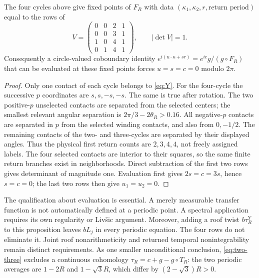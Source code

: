 \begin{proposition}\label{prop:lattice}
The four cycles above give fixed points of $F_R$ with data $(\kappa_1,\kappa_2,r,\text{return period})$ equal to the rows of
\begin{equation}\label{eq:matrix}
 V=\begin{pmatrix}0&0&2&1\\0&0&3&1\\1&0&4&1\\0&1&4&1\end{pmatrix},
                  \qquad |\det V|=1.
\end{equation}
Consequently a circle-valued coboundary identity
$e^{i(u\cdot\kappa+s r)}=e^{ic}g/(g\circ F_R)$ that can be evaluated at these fixed points forces $u=s=c=0$ modulo $2\pi$.
\end{proposition}
\begin{proof}
Only one contact of each cycle belongs to \eqref{eq:Y}. For the four-cycle the successive $p$ coordinates are $s,s,-s,-s$. The same is true after rotation. The two positive-$p$ unselected contacts are separated from the selected centers; the smallest relevant angular separation is $2\pi/3-2\theta_R>0.16$. All negative-$p$ contacts are separated in $p$ from the selected winding contacts, and also from $0,-1/2$. The remaining contacts of the two- and three-cycles are separated by their displayed angles. Thus the physical first return counts are $2,3,4,4$, not freely assigned labels. The four selected contacts are interior to their squares, so the same finite return branches exist in neighborhoods. Direct subtraction of the first two rows gives determinant of magnitude one. Evaluation first gives $2s=c=3s$, hence $s=c=0$; the last two rows then give $u_1=u_2=0$.
\end{proof}

The qualification about evaluation is essential. A merely measurable transfer function is not automatically defined at a periodic point. A spectral application requires its own regularity or Liv\v{s}ic argument. Moreover, adding a roof twist $b\tau_R^Y$ to this proposition leaves $bL_j$ in every periodic equation. The four rows do not eliminate it. Joint roof nonarithmeticity and returned temporal nonintegrability remain distinct requirements. As one smaller unconditional conclusion, \eqref{eq:two-three} excludes a continuous cohomology $\tau_R=c+g-g\circ T_R$: the two periodic averages are $1-2R$ and $1-\sqrt3R$, which differ by $(2-\sqrt3)R>0$.

